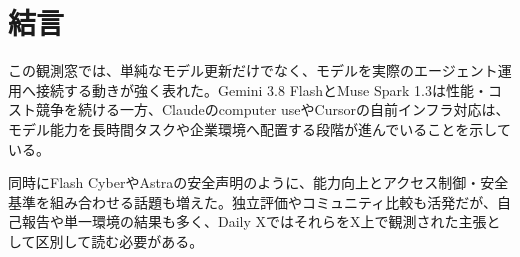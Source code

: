 \section*{結言}
この観測窓では、単純なモデル更新だけでなく、モデルを実際のエージェント運用へ接続する動きが強く表れた。Gemini 3.8 FlashとMuse Spark 1.3は性能・コスト競争を続ける一方、Claudeのcomputer useやCursorの自前インフラ対応は、モデル能力を長時間タスクや企業環境へ配置する段階が進んでいることを示している。

同時にFlash CyberやAstraの安全声明のように、能力向上とアクセス制御・安全基準を組み合わせる話題も増えた。独立評価やコミュニティ比較も活発だが、自己報告や単一環境の結果も多く、Daily XではそれらをX上で観測された主張として区別して読む必要がある。
